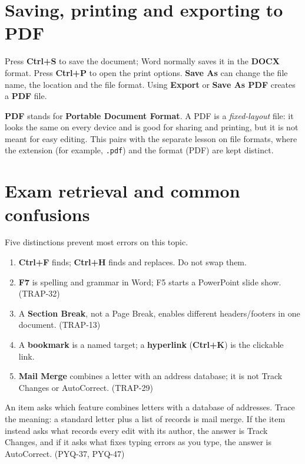 \section{Saving, printing and exporting to PDF}
Press \textbf{Ctrl+S} to save the document; Word normally saves it in the
\textbf{DOCX} format. Press \textbf{Ctrl+P} to open the print options.
\textbf{Save As} can change the file name, the location and the file format.
Using \textbf{Export} or \textbf{Save As PDF} creates a \textbf{PDF} file.

\textbf{PDF} stands for \textbf{Portable Document Format}. A PDF is a
\emph{fixed-layout} file: it looks the same on every device and is good for
sharing and printing, but it is not meant for easy editing. This pairs with the
separate lesson on file formats, where the extension (for example,
\texttt{.pdf}) and the format (PDF) are kept distinct.

\section{Exam retrieval and common confusions}
Five distinctions prevent most errors on this topic.
\begin{enumerate}
  \item \textbf{Ctrl+F} finds; \textbf{Ctrl+H} finds and replaces. Do not swap
    them.
  \item \textbf{F7} is spelling and grammar in Word; F5 starts a PowerPoint
    slide show. (TRAP-32)
  \item A \textbf{Section Break}, not a Page Break, enables different
    headers/footers in one document. (TRAP-13)
  \item A \textbf{bookmark} is a named target; a \textbf{hyperlink}
    (\textbf{Ctrl+K}) is the clickable link.
  \item \textbf{Mail Merge} combines a letter with an address database; it is
    not Track Changes or AutoCorrect. (TRAP-29)
\end{enumerate}

\begin{example}
An item asks which feature combines letters with a database of addresses.
Trace the meaning: a standard letter plus a list of records is mail merge. If
the item instead asks what records every edit with its author, the answer is
Track Changes, and if it asks what fixes typing errors as you type, the answer
is AutoCorrect. (PYQ-37, PYQ-47)
\end{example}

